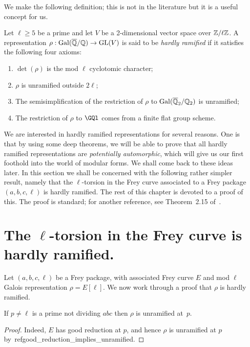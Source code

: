We make the following definition; this is not in the literature but it is a useful concept for us.

\begin{definition}\label{hardly_ramified} Let $\ell\geq5$ be a prime and let $V$ be a
  2-dimensional vector space over $\mathbb{Z}/\ell\mathbb{Z}$. A representation 
  $\rho: \operatorname{Gal}(\overline{\mathbb{Q}}/\mathbb{Q})\to \operatorname{GL}(V)$ is said to be \emph{hardly ramified} if it satisfies the following four axioms:
  \begin{enumerate}
  \item $\det(\rho)$ is the mod $\ell$ cyclotomic character;
  \item $\rho$ is unramified outside $2\ell$;
  \item The semisimplification of the restriction of $\rho$ to $\operatorname{Gal}(\overline{\mathbb{Q}}_2/\mathbb{Q}_2)$ is unramified;
  \item The restriction of $\rho$ to $\GQl$ comes from a finite flat group scheme.
  \end{enumerate}
\end{definition}

We are interested in hardly ramified representations for several reasons. One is that by using some 
deep theorems, we will be able to prove that all hardly ramified representations are 
\emph{potentially automorphic}, which will give us our first foothold into the world of modular 
forms. We shall come back to these ideas later. In this section we shall be concerned with
the following rather simpler result, namely that the $\ell$-torsion in the Frey curve
associated to a Frey package $(a,b,c,\ell)$ is hardly ramified. The rest of this chapter is 
devoted to a proof of this. The proof is standard; for another reference, see Theorem~2.15
of~\cite{ddt}.

\section{The $\ell$-torsion in the Frey curve is hardly ramified.}

Let $(a,b,c,\ell)$ be a Frey package, with associated Frey curve $E$ and mod $\ell$ Galois
 representation $\rho=E[\ell]$. We now work through a proof that $\rho$ is hardly ramified.

 \begin{theorem}\label{Frey_curve_good} If $p\not=\ell$ is a prime not dividing $abc$ then
  $\rho$ is unramified at~$p$.
 \end{theorem}
 \begin{proof} Indeed, $E$ has good reduction at $p$, and hence $\rho$ is unramified at $p$ by~ref{good_reduction_implies_unramified}. 
 \end{proof}

